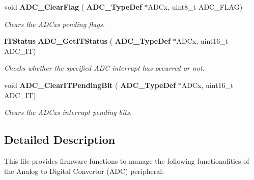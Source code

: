 \begin{DoxyCompactItemize}
void \textbf{ A\+D\+C\+\_\+\+Clear\+Flag} (\textbf{ A\+D\+C\+\_\+\+Type\+Def} $\ast$A\+D\+Cx, uint8\+\_\+t A\+D\+C\+\_\+\+F\+L\+AG)
\begin{DoxyCompactList}\small\item\em Clears the A\+D\+Cx\textquotesingle{}s pending flags. \end{DoxyCompactList}\item 
\textbf{ I\+T\+Status} \textbf{ A\+D\+C\+\_\+\+Get\+I\+T\+Status} (\textbf{ A\+D\+C\+\_\+\+Type\+Def} $\ast$A\+D\+Cx, uint16\+\_\+t A\+D\+C\+\_\+\+IT)
\begin{DoxyCompactList}\small\item\em Checks whether the specified A\+DC interrupt has occurred or not. \end{DoxyCompactList}\item 
void \textbf{ A\+D\+C\+\_\+\+Clear\+I\+T\+Pending\+Bit} (\textbf{ A\+D\+C\+\_\+\+Type\+Def} $\ast$A\+D\+Cx, uint16\+\_\+t A\+D\+C\+\_\+\+IT)
\begin{DoxyCompactList}\small\item\em Clears the A\+D\+Cx\textquotesingle{}s interrupt pending bits. \end{DoxyCompactList}\end{DoxyCompactItemize}


\subsection{Detailed Description}
This file provides firmware functions to manage the following functionalities of the Analog to Digital Convertor (A\+DC) peripheral\+: 


